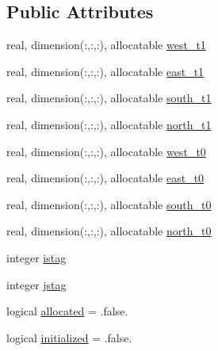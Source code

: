 \subsection*{Public Attributes}
\begin{DoxyCompactItemize}
\item 
real, dimension(\-:,\-:,\-:), allocatable \hyperlink{structfv__arrays__mod_1_1fv__nest__bc__type__3d_a1024840d7c642d142fdff9f39b999234}{west\-\_\-t1}
\item 
real, dimension(\-:,\-:,\-:), allocatable \hyperlink{structfv__arrays__mod_1_1fv__nest__bc__type__3d_a81e5130c31341a6d82c2b99e4c5954a3}{east\-\_\-t1}
\item 
real, dimension(\-:,\-:,\-:), allocatable \hyperlink{structfv__arrays__mod_1_1fv__nest__bc__type__3d_a849ce48eb3170962785f03b4d43cf3f1}{south\-\_\-t1}
\item 
real, dimension(\-:,\-:,\-:), allocatable \hyperlink{structfv__arrays__mod_1_1fv__nest__bc__type__3d_a64de9671e12ad64f1a8db8807210a607}{north\-\_\-t1}
\item 
real, dimension(\-:,\-:,\-:), allocatable \hyperlink{structfv__arrays__mod_1_1fv__nest__bc__type__3d_a168361be4515cf7122a8037445ecbded}{west\-\_\-t0}
\item 
real, dimension(\-:,\-:,\-:), allocatable \hyperlink{structfv__arrays__mod_1_1fv__nest__bc__type__3d_a5a6b5ce0ea604554586186fc591f83fe}{east\-\_\-t0}
\item 
real, dimension(\-:,\-:,\-:), allocatable \hyperlink{structfv__arrays__mod_1_1fv__nest__bc__type__3d_ab6793c0fd55ec0b709736be490b332e5}{south\-\_\-t0}
\item 
real, dimension(\-:,\-:,\-:), allocatable \hyperlink{structfv__arrays__mod_1_1fv__nest__bc__type__3d_ac926f51f9dbe5a1929103dea7712bd1f}{north\-\_\-t0}
\item 
integer \hyperlink{structfv__arrays__mod_1_1fv__nest__bc__type__3d_a3a61790b97caa2c43e41e654f9e31d5c}{istag}
\item 
integer \hyperlink{structfv__arrays__mod_1_1fv__nest__bc__type__3d_aeab6fc04407b6482a2fe68781db30221}{jstag}
\item 
logical \hyperlink{structfv__arrays__mod_1_1fv__nest__bc__type__3d_a8b3ed5868f96cc803a820909f351a48b}{allocated} = .false.
\item 
logical \hyperlink{structfv__arrays__mod_1_1fv__nest__bc__type__3d_ae0e0c42c38974311cb089dc36b4e3eb5}{initialized} = .false.
\end{DoxyCompactItemize}


